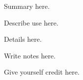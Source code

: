 

\ModuleRefSummary
Summary here.

\ModuleRefUse
Describe use here.

\ModuleRefDetails
Details here.

\ModuleRefNotes
Write notes here.

\ModuleRefCredits
Give yourself credit here.

